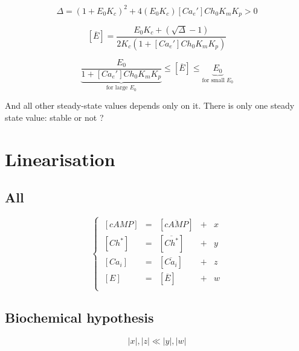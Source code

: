 \documentclass[aps,12pt]{revtex4}
\begin{document}
\begin{equation}
	\Delta =	(1+E_0 K_c)^2 + 4 (E_0 K_c) [Ca_e'] Ch_0    K_m  K_p > 0
\end{equation}

\begin{equation}
\boxed{
	[\overline{E}] = \dfrac{E_0 K_c + \left(\sqrt{\Delta} - 1\right)}
	{
	2 K_c(1+[Ca_e'] Ch_0 K_m K_p)
	}
}
\end{equation}

\begin{equation}
	\underbrace{\dfrac{E_0}{1+[Ca_e'] Ch_0 K_m K_p}}_{\text{for large $E_0$}}
		\leq	[\overline{E}] \leq \underbrace{E_0}_{\text{for small $E_0$}}
\end{equation}

And all other steady-state values depends only on it.
There is only one steady state value: stable or not ?

\section{Linearisation}

\subsection{All}

\begin{equation}
\left\lbrace
\begin{array}{lclcl}
~[cAMP] & = & [\overline{cAMP}] & + & x\\
~[Ch^\ast] & = & [\overline{Ch^\ast}] & + & y\\
~[Ca_i]    & = & [\overline{Ca_i}]    & + & z\\
~[E]       & = & [\overline{E}] & + & w\\
\end{array}
\right.
\end{equation}

\subsection{Biochemical hypothesis}

\begin{equation}
	|x|,|z| \ll |y|, |w|
\end{equation}
\end{document}
